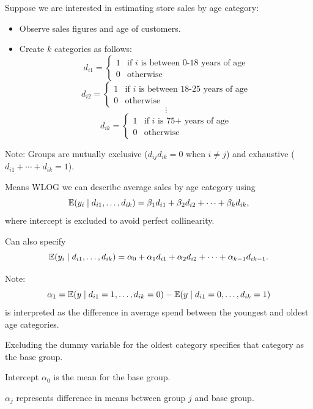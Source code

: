 \begin{remark}
	Suppose we are interested in estimating store sales by age category:
	\begin{itemize}
		\item Observe sales figures and age of customers.
		\item Create $k$ categories as follows: \[
			d_{i1} = \begin{cases}
				1 & \text{if } i \text{ is between 0-18 years of age} \\
				0 & \text{otherwise}
			\end{cases}
		\] \[
			d_{i2} = \begin{cases}
				1 & \text{if } i \text{ is between 18-25 years of age} \\
				0 & \text{otherwise}
			\end{cases}
		\] \[
			\vdots
		\] \[
			d_{ik} = \begin{cases}
				1 & \text{if } i \text{ is 75+ years of age} \\
				0 & \text{otherwise}
			\end{cases}
		\] 
	\end{itemize}
	
	Note: Groups are mutually exclusive ($d_{ij} d_{ik} = 0$ when $i \ne j$) and exhaustive ($d_{i1} + \cdots + d_{ik} = 1$).
	
	Means WLOG we can describe average sales by age category using \[
		\mathbb{E}(y_i \mid d_{i1}, \ldots, d_{ik}) = \beta_1 d_{i1} + \beta_2 d_{i2} + \cdots + \beta_k d_{ik}
	,\] where intercept is excluded to avoid perfect collinearity.
	
	Can also specify \[
		\mathbb{E}(y_i \mid d_{i1}, \ldots, d_{ik}) = \alpha_0 + \alpha_1 d_{i1} + \alpha_2 d_{i2} + \cdots + \alpha_{k-1} d_{ik-1}
	.\] 
	
	Note: \[
		\alpha_1 = \mathbb{E}(y \mid d_{i1} = 1, \ldots, d_{ik} = 0) - \mathbb{E}(y \mid d_{i1} = 0, \ldots, d_{ik} = 1)
	\] is interpreted as the difference in average spend between the youngest and oldest age categories.
	
	Excluding the dummy variable for the oldest category specifies that category as the base group.
	
	Intercept $\alpha_0$ is the mean for the base group.
	
	$\alpha_j$ represents difference in means between group $j$ and base group.
\end{remark}

